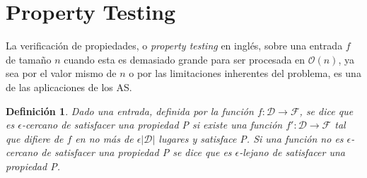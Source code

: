 \documentclass[10pt,a4paper]{article}
\renewcommand{\O}[1]{$\mathcal{O}(#1)$}
\newtheorem{definition}{Definición}[part]
\begin{document}
\section{Property Testing}
La verificación de propiedades, o \textit{property testing} en inglés, sobre una entrada $f$ de tamaño $n$ cuando esta es demasiado grande para ser procesada en \O{n}, ya sea por el valor mismo de $n$ o por las limitaciones inherentes del problema, es una de las aplicaciones de los AS.

\begin{definition}
  Dado una entrada, definida por la función $f:\mathcal{D} \rightarrow \mathcal{F}$, se dice que es $\epsilon$-cercano de satisfacer una propiedad P si existe una función $f':\mathcal{D} \rightarrow \mathcal{F}$ tal que difiere de $f$ en no más de $\epsilon|\mathcal{D}|$ lugares y satisface P. Si una función no es $\epsilon$-cercano de satisfacer una propiedad P se dice que es $\epsilon$-lejano de satisfacer una propiedad P.
\end{definition}
\end{document}
